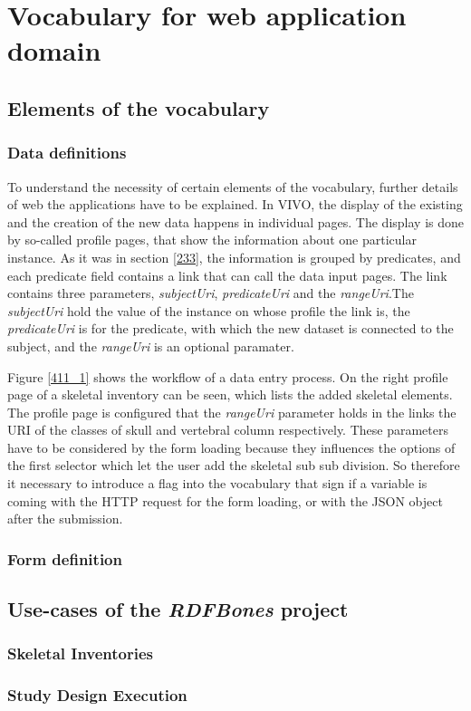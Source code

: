 \chapter{Vocabulary for web application domain}

\section{Elements of the vocabulary}


\subsection{Data definitions}

To understand the necessity of certain elements of the vocabulary, further details of web the applications have to be explained. In VIVO, the display of the existing and the creation of the new data happens in individual pages. The display is done by so-called profile pages, that show the information about one particular instance. As it was in section \ref{233}, the information is grouped by predicates, and each predicate field contains a link that can call the data input pages. The link contains three parameters, \textit{subjectUri}, \textit{predicateUri} and the \textit{rangeUri}.The \textit{subjectUri} hold the value of the instance on whose profile the link is, the \textit{predicateUri} is for the predicate, with which the new dataset is connected to the subject, and the \textit{rangeUri} is an optional paramater.



Figure \ref{411_1} shows the workflow of a data entry process. On the right profile page of a skeletal inventory can be seen, which lists the added skeletal elements. The profile page is configured that the \textit{rangeUri} parameter holds in the links the URI of the classes of  skull and vertebral column respectively. These parameters have to be considered by the form loading because they influences the options of the first selector which let the user add the skeletal sub sub division. So therefore it necessary to introduce a flag into the vocabulary that sign if a variable is coming with the HTTP request for the form loading, or with the JSON object after the submission.




\subsection{Form definition}





\section{Use-cases of the \textit{RDFBones} project}

\subsection{Skeletal Inventories}

\subsection{Study Design Execution}
